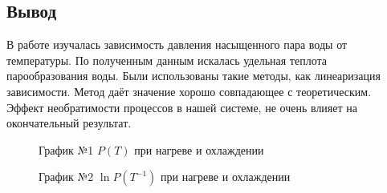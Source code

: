 \documentclass[a4paper, 12pt]{article}
\begin{document}
\begin{center}
	\subsection*{Вывод}
\end{center}
	
В работе изучалась зависимость давления насыщенного пара воды от температуры. По полученным данным искалась удельная теплота парообразования воды. Были использованы такие методы, как линеаризация зависимости. Метод даёт значение хорошо совпадающее с теоретическим. Эффект необратимости процессов в нашей системе, не очень влияет на окончательный результат.


\newpage

\begin{figure}[h]
	\caption[]{\label{fig:2} График №1 $P(T)$ при нагреве и охлаждении}
\end{figure}

\begin{figure}[h]
	\caption[]{\label{fig:3} График №2 $\ln P(T^{-1})$ при нагреве и охлаждении}
\end{figure}
\end{document}
